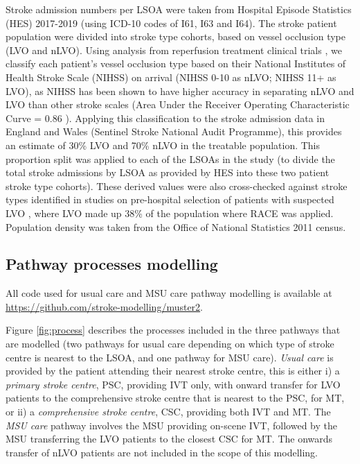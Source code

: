 Stroke admission numbers per LSOA were taken from Hospital Episode Statistics (HES) 2017-2019 (using ICD-10 codes of I61, I63 and I64). The stroke patient population were divided into stroke type cohorts, based on vessel occlusion type (LVO and nLVO). Using analysis from reperfusion treatment clinical trials \cite{lees_time_2010, emberson_effect_2014, goyal_endovascular_2016, fransen_time_2016}, we classify each patient's vessel occlusion type based on their National Institutes of Health Stroke Scale (NIHSS) on arrival (NIHSS 0-10 as nLVO; NIHSS 11+ as LVO), as NIHSS has been shown to have higher accuracy in separating nLVO and LVO than other stroke scales (Area Under the Receiver Operating Characteristic Curve = 0.86 \cite{duvekot_comparison_2021}). Applying this classification to the stroke admission data in England and Wales (Sentinel Stroke National Audit Programme), this provides an estimate of 30\% LVO and 70\% nLVO in the treatable population. This proportion split was applied to each of the LSOAs in the study (to divide the total stroke admissions by LSOA as provided by HES into these two patient stroke type cohorts). These derived values were also cross-checked against stroke types identified in studies on pre-hospital selection of patients with suspected LVO \cite{de_la_ossa_herrero_design_2013}, where LVO made up 38\% of the population where RACE was applied. Population density was taken from the Office of National Statistics 2011 census.

\subsection{Pathway processes modelling}

All code used for usual care and MSU care pathway modelling is available at \url{https://github.com/stroke-modelling/muster2}.

Figure \ref{fig:process} describes the processes included in the three pathways that are modelled (two pathways for usual care depending on which type of stroke centre is nearest to the LSOA, and one pathway for MSU care). \textit{Usual care} is provided by the patient attending their nearest stroke centre, this is either i) a \textit{primary stroke centre}, PSC, providing IVT only, with onward transfer for LVO patients to the comprehensive stroke centre that is nearest to the PSC, for MT, or ii) a \textit{comprehensive stroke centre}, CSC, providing both IVT and MT. The \textit{MSU care} pathway involves the MSU providing on-scene IVT, followed by the MSU transferring the LVO patients to the closest CSC for MT. The onwards transfer of nLVO patients are not included in the scope of this modelling.

